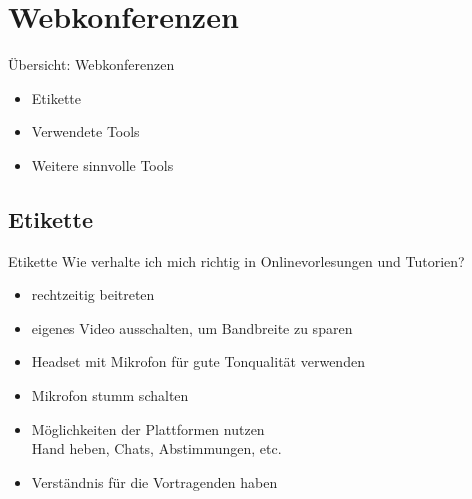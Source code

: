 
\section{Webkonferenzen}
\begin{frame}{Übersicht: Webkonferenzen}
	\Large
	\begin{itemize}
		\item Etikette
		\item Verwendete Tools
		\item Weitere sinnvolle Tools
	\end{itemize}
    
\end{frame}

\subsection{Etikette}
\begin{frame}{Etikette}
Wie verhalte ich mich richtig in Onlinevorlesungen und Tutorien?
	\begin{itemize}
		\item rechtzeitig beitreten
		\item eigenes Video ausschalten, um Bandbreite zu sparen
		\item Headset mit Mikrofon für gute Tonqualität verwenden
		\item Mikrofon stumm schalten
		\item Möglichkeiten der Plattformen nutzen \\
		Hand heben, Chats, Abstimmungen, etc.
		\item Verständnis für die Vortragenden haben
	\end{itemize}
\end{frame}

